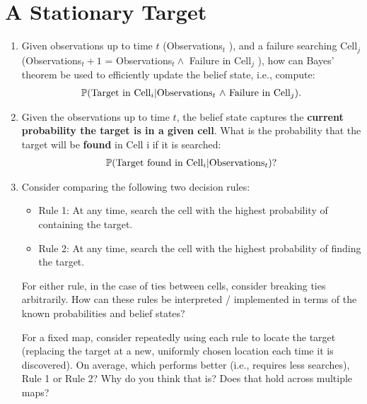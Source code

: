 \documentclass[letter]{article}
\begin{document}
\section{A Stationary Target}
\label{sec:A Stationary Target}
\begin{enumerate}
	\item {Given observations up to time $ t $ (Observations$ _t $ ), and a failure searching Cell$ _j $ (Observations$ _t+1 $ = Observations$_t \wedge $ Failure in Cell$ _j $ ), how can Bayes' theorem be used to efficiently update the belief state, i.e., compute: } 
	\begin{align}
		\mathbb{P} \text{(Target in Cell$ _i | $Observations$_t $  $\wedge $ Failure in Cell$ _j $).}
	\end{align}
	
	\item {Given the observations up to time $ t $, the belief state captures the \textbf{current probability the target is in a given cell}. What is the probability that the target will be \textbf{found} in Cell i if it is searched:} 
	\begin{align}
	\mathbb{P} \text{(Target found in Cell$ _i | $Observations$_t $)?}
	\end{align}
	
	\item {Consider comparing the following two decision rules:
		\begin{itemize}
			\item {Rule 1: At any time, search the cell with the highest probability of containing the target.}
			\item {Rule 2: At any time, search the cell with the highest probability of finding the target.}
		\end{itemize} 
		\par{For either rule, in the case of ties between cells, consider breaking ties arbitrarily. How can these rules be interpreted / implemented in terms of the known probabilities and belief states?}
		\par{For a fixed map, consider repeatedly using each rule to locate the target (replacing the target at a new,
			uniformly chosen location each time it is discovered). On average, which performs better (i.e., requires less
			searches), Rule 1 or Rule 2? Why do you think that is? Does that hold across multiple maps?}
		}
	

\end{enumerate}
\end{document}
